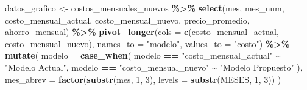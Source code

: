 \documentclass[
]{article}
\newenvironment{Shaded}{\begin{snugshade}}{\end{snugshade}}
\newcommand{\AttributeTok}[1]{\textcolor[rgb]{0.13,0.29,0.53}{#1}}
\newcommand{\DecValTok}[1]{\textcolor[rgb]{0.00,0.00,0.81}{#1}}
\newcommand{\FunctionTok}[1]{\textcolor[rgb]{0.13,0.29,0.53}{\textbf{#1}}}
\newcommand{\NormalTok}[1]{#1}
\newcommand{\OtherTok}[1]{\textcolor[rgb]{0.56,0.35,0.01}{#1}}
\newcommand{\SpecialCharTok}[1]{\textcolor[rgb]{0.81,0.36,0.00}{\textbf{#1}}}
\newcommand{\StringTok}[1]{\textcolor[rgb]{0.31,0.60,0.02}{#1}}
\begin{document}
\begin{Shaded}
\begin{Highlighting}[]
\NormalTok{datos\_grafico }\OtherTok{\textless{}{-}}\NormalTok{ costos\_mensuales\_nuevos }\SpecialCharTok{\%\textgreater{}\%}
  \FunctionTok{select}\NormalTok{(mes, mes\_num, costo\_mensual\_actual, costo\_mensual\_nuevo, precio\_promedio, ahorro\_mensual) }\SpecialCharTok{\%\textgreater{}\%}
  \FunctionTok{pivot\_longer}\NormalTok{(}\AttributeTok{cols =} \FunctionTok{c}\NormalTok{(costo\_mensual\_actual, costo\_mensual\_nuevo), }
               \AttributeTok{names\_to =} \StringTok{"modelo"}\NormalTok{, }\AttributeTok{values\_to =} \StringTok{"costo"}\NormalTok{) }\SpecialCharTok{\%\textgreater{}\%}
  \FunctionTok{mutate}\NormalTok{(}
    \AttributeTok{modelo =} \FunctionTok{case\_when}\NormalTok{(}
\NormalTok{      modelo }\SpecialCharTok{==} \StringTok{"costo\_mensual\_actual"} \SpecialCharTok{\textasciitilde{}} \StringTok{"Modelo Actual"}\NormalTok{,}
\NormalTok{      modelo }\SpecialCharTok{==} \StringTok{"costo\_mensual\_nuevo"} \SpecialCharTok{\textasciitilde{}} \StringTok{"Modelo Propuesto"}
\NormalTok{    ),}
    \AttributeTok{mes\_abrev =} \FunctionTok{factor}\NormalTok{(}\FunctionTok{substr}\NormalTok{(mes, }\DecValTok{1}\NormalTok{, }\DecValTok{3}\NormalTok{), }
                       \AttributeTok{levels =} \FunctionTok{substr}\NormalTok{(MESES, }\DecValTok{1}\NormalTok{, }\DecValTok{3}\NormalTok{))}
\NormalTok{  )}


\end{Highlighting}
\end{Shaded}
\end{document}
